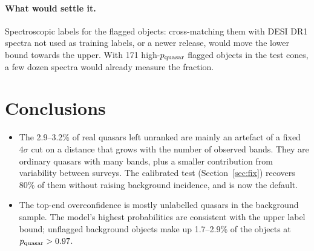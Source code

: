 \documentclass[11pt,a4paper]{article}
\newcommand{\pq}{p_{\rm quasar}}
\begin{document}
\paragraph{What would settle it.} Spectroscopic labels for the flagged objects: cross-matching them with DESI DR1
spectra not used as training labels, or a newer release, would move the lower bound towards the upper. With 171
high-$\pq$ flagged objects in the test cones, a few dozen spectra would already measure the fraction.

\section{Conclusions}
\begin{itemize}
\item The 2.9--3.2\% of real quasars left unranked are mainly an artefact of a fixed $4\sigma$ cut on a distance
  that grows with the number of observed bands. They are ordinary quasars with many bands, plus a smaller
  contribution from variability between surveys. The calibrated test (Section~\ref{sec:fix}) recovers 80\% of
  them without raising background incidence, and is now the default.
\item The top-end overconfidence is mostly unlabelled quasars in the background sample. The model's highest
  probabilities are consistent with the upper label bound; unflagged background objects make up 1.7--2.9\% of
  the objects at $\pq>0.97$.
\end{itemize}
\end{document}
